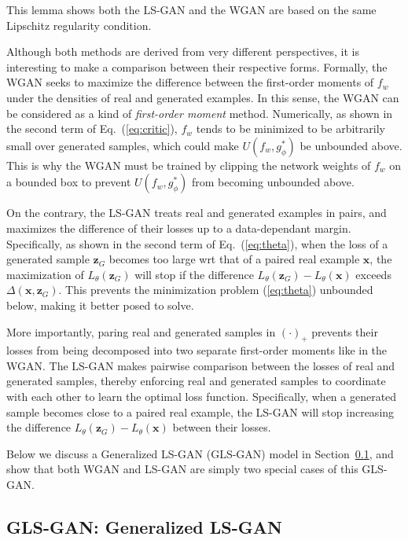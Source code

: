 \documentclass[11pt,fullpage, letterpaper,twoside]{article}
\newcommand{\1}[1]{\mathds{1}_{\left[#1\right]}}
\begin{document}
This lemma shows both the LS-GAN and the WGAN are based on the same Lipschitz regularity condition.

Although both methods are derived from very different perspectives, it is interesting to make a comparison between their respective forms. Formally, the WGAN seeks to maximize the difference between the first-order moments of $f_w$ under the densities of real and generated examples. In this sense, the WGAN can be considered as a kind of {\em first-order moment} method. Numerically, as shown in the second term of Eq.~(\ref{eq:critic}), $f_w$ tends to be minimized to be arbitrarily small over generated samples, which could make $U(f_w,g_\phi^*)$ be unbounded above. This is why the WGAN must be trained by clipping the network weights of $f_w$ on a bounded box to prevent $U(f_w,g_\phi^*)$ from becoming unbounded above.

On the contrary, the LS-GAN treats real and generated examples in pairs, and maximizes the difference of their losses up to a data-dependant margin. Specifically, as shown in the second term of Eq.~(\ref{eq:theta}), when the loss of a generated sample $\mathbf z_G$ becomes too large wrt that of a paired real example $\mathbf x$, the maximization of $L_\theta(\mathbf z_G)$ will stop if the difference $L_\theta(\mathbf z_G)-L_\theta(\mathbf x)$ exceeds $\Delta(\mathbf x, \mathbf z_G)$. This prevents the minimization problem (\ref{eq:theta}) unbounded below, making it better posed to solve.

More importantly, paring real and generated samples in $(\cdot)_+$ prevents their losses from being decomposed into two separate first-order moments like in the WGAN. The LS-GAN makes pairwise comparison between the losses of real and generated samples, thereby enforcing real and generated samples to coordinate with each other to learn the optimal loss function. Specifically, when a generated sample becomes close to a paired real example, the LS-GAN will stop increasing the difference $L_\theta(\mathbf z_G)-L_\theta(\mathbf x)$ between their losses.



Below we discuss a Generalized LS-GAN (GLS-GAN) model in Section~\ref{sec:glsgan}, and show that both WGAN and LS-GAN are simply two special cases of this GLS-GAN.



\subsection{GLS-GAN: Generalized LS-GAN}\label{sec:glsgan}
\end{document}
